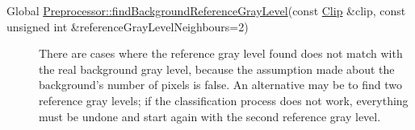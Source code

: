 \label{bug__bug000001}
\hypertarget{bug__bug000001}{}
 \begin{description}
\item[Global \hyperlink{class_preprocessor_a941f81382bd8e235e4dd12481342be4}{Preprocessor::findBackgroundReferenceGrayLevel}(const \hyperlink{class_clip}{Clip} \&clip, const unsigned int \&referenceGrayLevelNeighbours=2) ]There are cases where the reference gray level found does not match with the real background gray level, because the assumption made about the background's number of pixels is false. An alternative may be to find two reference gray levels; if the classification process does not work, everything must be undone and start again with the second reference gray level. \end{description}
